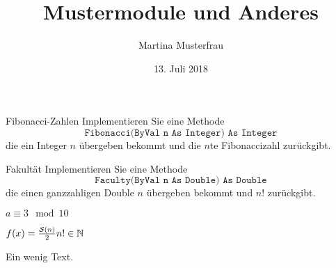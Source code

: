 \documentclass[]{abgabe}
\title{Mustermodule und Anderes}
\date{13. Juli 2018}
\author{Martina Musterfrau}
\begin{document}
	\maketitle
	\begin{noornamentex}{Fibonacci-Zahlen}
		Implementieren Sie eine Methode
		\begin{equation*}
			\texttt{Fibonacci(ByVal n As Integer) As Integer}
		\end{equation*}
		die ein Integer $n$ übergeben bekommt und die $n$te Fibonaccizahl zurückgibt.
	\end{noornamentex}

	\begin{ex}{Fakultät}
		Implementieren Sie eine Methode $$\texttt{Faculty(ByVal n As Double) As Double}$$ die einen ganzzahligen Double $n$ übergeben bekommt und $n!$ zurückgibt.
		\begin{subex}
			\item $a\equiv 3\mod 10$
			\item $f(x) =\frac{\mathcal S(n)}{2} n!\in\mathbb{N}$
			\item Ein wenig Text.
		\end{subex}

		

	\end{ex}
\end{document}
